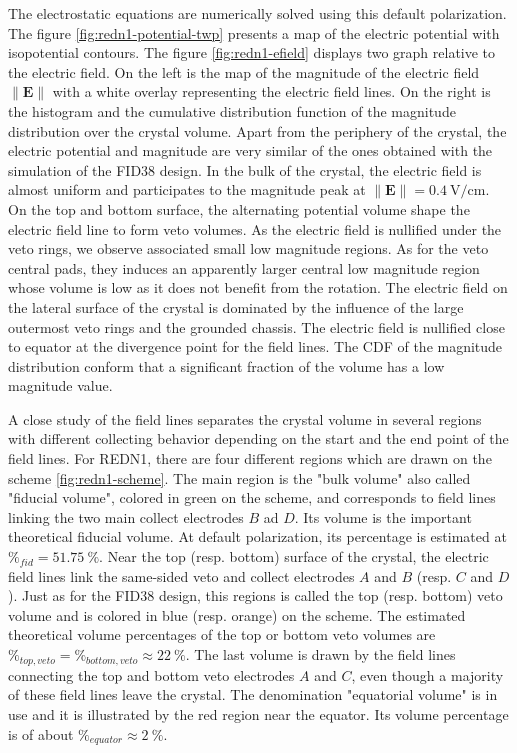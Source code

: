 The electrostatic equations are numerically solved using this default polarization. The figure \ref{fig:redn1-potential-twp} presents a map of the electric potential with isopotential contours. The  figure \ref{fig:redn1-efield} displays two graph relative to the electric field. On the left is the map of the magnitude of the electric field $\| \bm{E} \|$ with a white overlay representing the electric field lines. On the right is the histogram and the cumulative distribution function of the magnitude distribution over the crystal volume.
Apart from the periphery of the crystal, the electric potential and magnitude are very similar of the ones obtained with the simulation of the FID38 design. In the bulk of the crystal, the electric field is almost uniform and participates to the magnitude peak at $\| \bm{E} \| = \SI{0.4}{\volt\per\centi\meter}$. 
On the top and bottom surface, the alternating potential volume shape the electric field line to form veto volumes. As the electric field is nullified under the veto rings, we observe associated small low magnitude regions. As for the veto central pads, they induces an apparently larger central low magnitude region whose volume is low as it does not benefit from the rotation.
The electric field on the lateral surface of the crystal is dominated by the influence of the large outermost veto rings and the grounded chassis. The electric field is nullified close to equator at the divergence point for the field lines.
The CDF of the magnitude distribution conform that a significant fraction of the volume has a low magnitude value.

A close study of the field lines separates the crystal volume in several regions with different collecting behavior depending on the start and the end point of the field lines. For REDN1, there are four different regions which are drawn on the scheme \ref{fig:redn1-scheme}. 
The main region is the "bulk volume" also called "fiducial volume", colored in green on the scheme, and corresponds to field lines linking the two main collect electrodes $B$ ad $D$. Its volume is the important theoretical fiducial volume. At default polarization, its percentage is estimated at $\%_{fid}=\SI{51.75}{\percent}$.
Near the top (resp. bottom) surface of the crystal, the electric field lines link the same-sided veto and collect electrodes $A$ and $B$ (resp. $C$ and $D$). Just as for the FID38 design, this regions is called the top (resp. bottom) veto volume and is colored in blue (resp. orange) on the scheme. The estimated theoretical volume percentages of the top or bottom veto volumes are $\%_{top,veto} = \%_{bottom,veto} \approx \SI{22}{\percent}$. 
The last volume is drawn by the field lines connecting the top and bottom veto electrodes $A$ and $C$, even though a majority of these field lines leave the crystal. The denomination "equatorial volume" is in use and it is illustrated by the red region near the equator. Its volume percentage is of about $\%_{equator} \approx \SI{2}{\percent}$.

